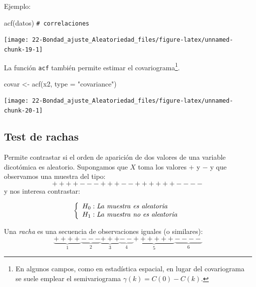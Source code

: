 \documentclass[
]{book}
\newenvironment{Shaded}{\begin{snugshade}}{\end{snugshade}}
\newcommand{\AttributeTok}[1]{\textcolor[rgb]{0.77,0.63,0.00}{#1}}
\newcommand{\CommentTok}[1]{\textcolor[rgb]{0.56,0.35,0.01}{\textit{#1}}}
\newcommand{\FunctionTok}[1]{\textcolor[rgb]{0.00,0.00,0.00}{#1}}
\newcommand{\NormalTok}[1]{#1}
\newcommand{\OtherTok}[1]{\textcolor[rgb]{0.56,0.35,0.01}{#1}}
\newcommand{\StringTok}[1]{\textcolor[rgb]{0.31,0.60,0.02}{#1}}
\theoremstyle{break}
\theoremstyle{nonumberplain}
\renewcommand{\CommentTok}[1]{\textcolor[rgb]{0.41,0.41,0.41}{\texttt{#1}}}
\begin{document}
Ejemplo:

\begin{Shaded}
\begin{Highlighting}[]
\FunctionTok{acf}\NormalTok{(datos)  }\CommentTok{\# correlaciones}
\end{Highlighting}
\end{Shaded}

\begin{center}\texttt{[image: 22-Bondad\_ajuste\_Aleatoriedad\_files/figure-latex/unnamed-chunk-19-1]} \end{center}

La función \texttt{acf} también permite estimar el covariograma\footnote{En algunos campos, como en estadística espacial, en lugar del covariograma se suele emplear el semivariograma \(\gamma(k) = C(0) - C(k)\).}.

\begin{Shaded}
\begin{Highlighting}[]
\NormalTok{covar }\OtherTok{\textless{}{-}} \FunctionTok{acf}\NormalTok{(x2, }\AttributeTok{type =} \StringTok{"covariance"}\NormalTok{)}
\end{Highlighting}
\end{Shaded}

\begin{center}\texttt{[image: 22-Bondad\_ajuste\_Aleatoriedad\_files/figure-latex/unnamed-chunk-20-1]} \end{center}

\hypertarget{test-de-rachas}{%
\subsection{Test de rachas}\label{test-de-rachas}}

Permite contrastar si el orden de aparición de dos valores de una
variable dicotómica es aleatorio.
Supongamos que \(X\) toma los valores \(+\) y \(-\)
y que observamos una muestra del tipo:
\[++++---+++--++++++----\]
y nos interesa contrastar:

\[\left\{ \begin{array}[c]{l}
    H_{0}:\mathit{La\ muestra\ es\ aleatoria}\\
    H_{1}:\mathit{La\ muestra\ no\ es\ aleatoria}
\end{array}
\right.\]

Una \emph{racha} es una secuencia de observaciones iguales (o
similares):
\[\underbrace{++++}_{1}\underbrace{---}_{2}\underbrace{+++}_{3}
\underbrace{--}_{4}\underbrace{++++++}_{5}\underbrace{----}_{6}\]
\end{document}
